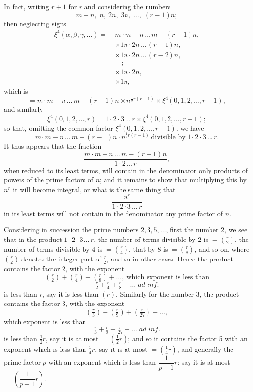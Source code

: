 \documentclass[11pt]{article}
\begin{document}
In fact, writing $r+1$ for $r$ and considering the numbers
\[ m+n,\;n,\;2n,\;3n,\;\ldots,\;(r-1)n; \]
then neglecting signs
\begin{align*}
\xi^4(\alpha,\beta,\gamma,\ldots) =\;& m\cdot m - n\,\ldots\,m-(r-1)n,\\
& \times 1n\cdot 2n\,\ldots\,(r-1)n,\\
& \times 1n\cdot 2n\,\ldots\,(r-2)n,\\
& \quad\vdots\\
& \times 1n\cdot 2n,\\
& \times 1n,
\end{align*}
which is
\[ = m\cdot m-n\,\ldots\,m-(r-1)n \times n^{\frac{1}{2}r(r-1)} \times \xi^4(0,1,2,\ldots,r-1), \]
and similarly
\[ \xi^4(0,1,2,\ldots,r) = 1\cdot 2\cdot 3\,\ldots\,r \times \xi^4(0,1,2,\ldots,r-1); \]
so that, omitting the common factor $\xi^4(0,1,2,\ldots,r-1)$, we have
\[ m\cdot m-n\,\ldots\,m-(r-1)n\cdot n^{\frac{1}{2}r(r-1)}\;\text{divisible by}\; 1\cdot 2\cdot 3\,\ldots\,r. \]
It thus appears that the fraction
\[ \frac{m\cdot m-n\,\ldots\,m-(r-1)n}{1\cdot 2\,\ldots\,r}, \]
when reduced to its least terms, will contain in the denominator only products of powers of the prime factors of $n$; and it remains to show that multiplying this by $n^r$ it will become integral, or what is the same thing that
\[ \frac{n^r}{1\cdot 2\cdot 3\,\ldots\,r} \]
in its least terms will not contain in the denominator any prime factor of $n$.

Considering in succession the prime numbers $2, 3, 5, \ldots$, first the number 2, we see that in the product $1\cdot 2\cdot 3\,\ldots\,r$, the number of terms divisible by 2 is $=\left(\tfrac{r}{2}\right)$, the number of terms divisible by 4 is $=\left(\tfrac{r}{4}\right)$, that by 8 is $=\left(\tfrac{r}{8}\right)$, and so on, where $\left(\tfrac{r}{2}\right)$ denotes the integer part of $\tfrac{r}{2}$, and so in other cases. Hence the product contains the factor 2, with the exponent
\[ \left(\tfrac{r}{2}\right) + \left(\tfrac{r}{4}\right) + \left(\tfrac{r}{8}\right) + \ldots, \;\text{which exponent is less than} \]
\[ \tfrac{r}{2} + \tfrac{r}{4} + \tfrac{r}{8} + \ldots\;\textit{ad inf.} \]
is less than $r$, say it is less than $(r)$. Similarly for the number 3, the product contains the factor 3, with the exponent
\[ \left(\tfrac{r}{3}\right) + \left(\tfrac{r}{9}\right) + \left(\tfrac{r}{27}\right) + \ldots, \]
which exponent is less than
\[ \tfrac{r}{3} + \tfrac{r}{9} + \tfrac{r}{27} + \ldots\;\textit{ad inf.} \]
is less than $\tfrac{1}{2}r$, say it is at most $=(\tfrac{1}{2}r)$; and so it contains the factor 5 with an exponent which is less than $\tfrac{1}{4}r$, say it is at most $=(\tfrac{1}{4}r)$, and generally the prime factor $p$ with an exponent which is less than $\dfrac{1}{p-1}r$: say it is at most $=\left(\dfrac{1}{p-1}r\right)$.
\end{document}
